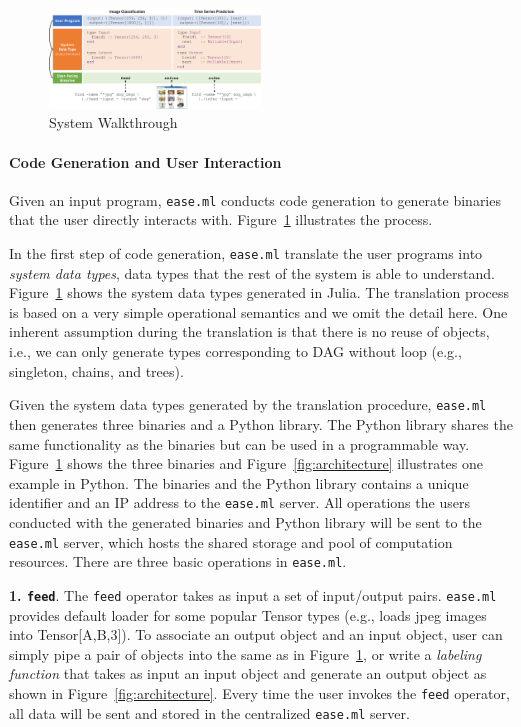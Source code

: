 \documentclass[letterpaper]{vldb}
\newcommand{\eml}{\texttt{ease.ml}\xspace}
\begin{document}
\begin{figure}[t]
\centering
\includegraphics[width=0.5\textwidth]{figures/arch}
\vspace{-2em}
\caption{System Walkthrough}
\vspace{-2em}
\label{fig:walkthrough}
\end{figure}


\vspace{-2em}
\paragraph*{Code Generation and User Interaction}

Given an input program, \eml conducts code generation
to generate binaries that the user directly interacts with.
Figure~\ref{fig:walkthrough} illustrates the process.

In the first step of code generation, \eml translate
the user programs into {\em system data types}, data types
that the rest of the system is able to understand. 
Figure~\ref{fig:walkthrough} shows the system data types
generated in Julia. The translation process is based
on a very simple operational semantics and we omit the detail
here. One inherent assumption during the translation
is that there is no reuse of objects, i.e., we can 
only generate types corresponding to DAG without loop
(e.g., singleton, chains, and trees). 

Given the system data types generated by the translation
procedure, \eml then generates three binaries and
a Python library.
The Python library shares the same functionality as
the binaries but can be used in a programmable way.
Figure~\ref{fig:walkthrough} shows the three binaries
and Figure~\ref{fig:architecture} illustrates one
example in Python. The binaries and the Python library
contains a unique identifier and an IP address to the
\eml server. All operations the users conducted with
the generated binaries and Python library will be 
sent to the \eml server, which hosts the shared
storage and pool of computation resources.
There are three basic operations in \eml.

\noindent
{\textbf{1. \texttt{feed}}.} The \texttt{feed} operator takes
as input a set of input/output pairs. \eml provides
default loader for some popular Tensor types (e.g., loads
jpeg images into Tensor[A,B,3]). To associate an output
object and an input object, user can simply pipe a pair of
objects into the same as in Figure~\ref{fig:walkthrough}, or
write a {\em labeling function} that takes as input an input
object and generate an output object as shown in Figure~\ref{fig:architecture}.
Every time the user invokes the \texttt{feed} operator,
all data will be sent and stored in the centralized
\eml server.
\end{document}
